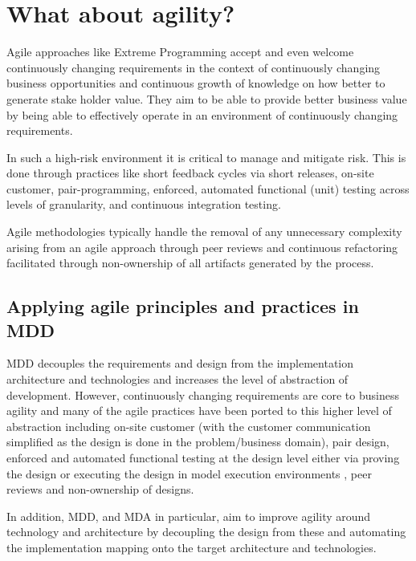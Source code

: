 \section{What about agility?}
\label{sec:urdadAgility}

Agile approaches
\cite{martin:agileSoftwareDevelopment, agileManifesto}
like Extreme Programming \cite{beck:extremeProgrammingExplained2}
accept and even welcome continuously changing requirements in the
context of continuously changing business opportunities and
continuous growth of knowledge on how better to generate stake
holder value. They aim to be able to provide better business value
by being able to effectively operate in an environment of
continuously changing requirements.

In such a high-risk environment it is critical to manage and mitigate
risk. This is done through practices like short feedback cycles
via short releases, on-site customer, pair-programming,
enforced, automated functional (unit) testing across levels of
granularity, and continuous integration testing.

Agile methodologies typically handle the removal of any unnecessary complexity
arising from an agile approach through peer reviews and continuous refactoring
facilitated through non-ownership of all artifacts generated by the process.


\subsection{Applying agile principles and practices in MDD}

MDD decouples the requirements and design from the implementation architecture
and technologies and increases the level of abstraction of development.
However, continuously changing requirements are core to business agility
and many of the agile practices have been ported to this higher level of abstraction
including on-site customer (with the customer communication simplified
as the design is done in the problem/business domain), pair design,
enforced and automated functional testing at the design level either via
proving the design or executing the design in model execution environments
\cite{kirshin:umlGenericModelExecutionEngine},
peer reviews and non-ownership of designs.

In addition, MDD, and MDA in particular, aim to improve agility around technology
and architecture by decoupling the design from these and automating the
implementation mapping onto the target architecture and technologies.

